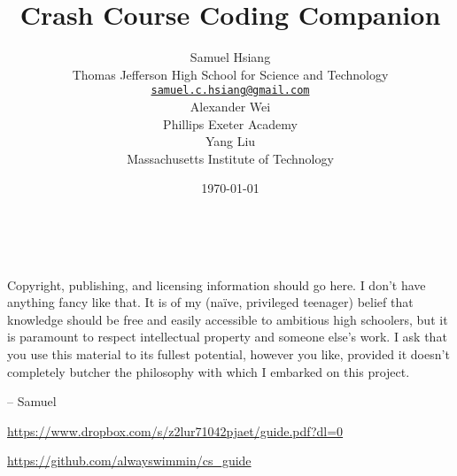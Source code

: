 \title{Crash Course Coding Companion}
\author{
Samuel Hsiang \\ 
Thomas Jefferson High School for Science and Technology \\ 
\href{mailto:samuel.c.hsiang@gmail.com}{\texttt{\textup{samuel.c.hsiang@gmail.com}}} \\
\vspace{.7em}
Alexander Wei \\
Phillips Exeter Academy \\
\vspace{.7em}
Yang Liu \\
Massachusetts Institute of Technology
}
\date{\today}

\maketitle

\newpage
~\vfill
\thispagestyle{empty}


\noindent Copyright, publishing, and licensing information should go here. I don't have anything fancy like that. It is of my (na\"{i}ve, privileged teenager) belief that knowledge should be free and easily accessible to ambitious high schoolers, but it is paramount to respect intellectual property and someone else's work. I ask that you use this material to its fullest potential, however you like, provided it doesn't completely butcher the philosophy with which I embarked on this project.

\begin{flushright}
-- Samuel
\end{flushright}



\noindent \url{https://www.dropbox.com/s/z2lur71042pjaet/guide.pdf?dl=0}

\noindent \url{https://github.com/alwayswimmin/cs_guide}



\newpage
\thispagestyle{empty}
